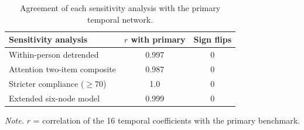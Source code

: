 \begin{table}[!htbp]
\raggedright
\caption{Agreement of each sensitivity analysis with the primary temporal network.}
\label{tab:agreement}
\footnotesize
\begingroup
\setlength{\tabcolsep}{4pt}
\renewcommand{\arraystretch}{1.08}
\noindent
\begin{tabular*}{\textwidth}{@{\extracolsep{\fill}}lcc@{}}
\toprule
Sensitivity analysis & $r$ with primary & Sign flips \\
\midrule
Within-person detrended & 0.997 & 0 \\
Attention two-item composite & 0.987 & 0 \\
Stricter compliance ($\geq 70$) & 1.0 & 0 \\
Extended six-node model & 0.999 & 0 \\
\bottomrule
\end{tabular*}
\par\vspace{3pt}\noindent\parbox{\textwidth}{\footnotesize\textit{Note.} $r$ = correlation of the 16 temporal coefficients with the primary benchmark.}
\endgroup
\end{table}
